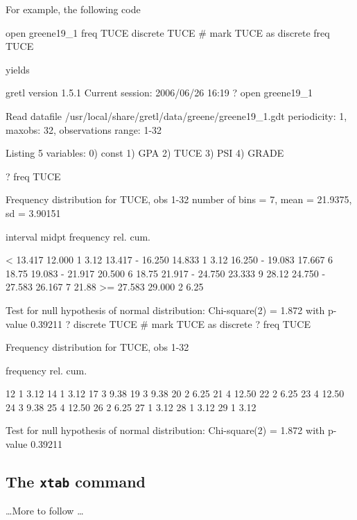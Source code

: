 For example, the following code
\begin{code}
  open greene19_1
  freq TUCE
  discrete TUCE # mark TUCE as discrete
  freq TUCE
\end{code}
yields
\begin{code}
gretl version 1.5.1
Current session: 2006/06/26 16:19
? open greene19_1

Read datafile /usr/local/share/gretl/data/greene/greene19_1.gdt
periodicity: 1, maxobs: 32,
observations range: 1-32

Listing 5 variables:
  0) const    1) GPA      2) TUCE     3) PSI      4) GRADE  

? freq TUCE

Frequency distribution for TUCE, obs 1-32
number of bins = 7, mean = 21.9375, sd = 3.90151

       interval          midpt   frequency    rel.     cum.

          <  13.417     12.000        1      3.12%
    13.417 - 16.250     14.833        1      3.12%
    16.250 - 19.083     17.667        6     18.75%
    19.083 - 21.917     20.500        6     18.75%
    21.917 - 24.750     23.333        9     28.12%
    24.750 - 27.583     26.167        7     21.88%
          >= 27.583     29.000        2      6.25%

Test for null hypothesis of normal distribution:
Chi-square(2) = 1.872 with p-value 0.39211
? discrete TUCE # mark TUCE as discrete
? freq TUCE

Frequency distribution for TUCE, obs 1-32

          frequency    rel.     cum.

  12           1      3.12%
  14           1      3.12%
  17           3      9.38%
  19           3      9.38%
  20           2      6.25%
  21           4     12.50%
  22           2      6.25%
  23           4     12.50%
  24           3      9.38%
  25           4     12.50%
  26           2      6.25%
  27           1      3.12%
  28           1      3.12%
  29           1      3.12%

Test for null hypothesis of normal distribution:
Chi-square(2) = 1.872 with p-value 0.39211
\end{code}


\subsection{The \texttt{xtab} command}
\label{discr-xtab}

\ldots More to follow \ldots


